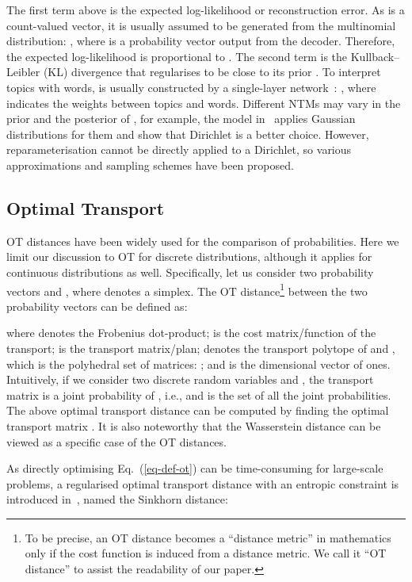 \documentclass{article}
\begin{document}
The first term above is the expected log-likelihood or reconstruction error. As  is a count-valued vector, it is usually assumed to be generated from the multinomial distribution: , where  is a probability vector output from the decoder. Therefore, the expected log-likelihood is proportional to . The second term is the Kullback–Leibler (KL) divergence that regularises  to be close to its prior . To interpret topics with words,  is usually constructed by a single-layer network~\citep{srivastava2017autoencoding}: , where  indicates the weights between topics and words.
Different NTMs may vary in the prior and the posterior of , for example, the model in~\citet{miao2017discovering} applies Gaussian distributions for them and \citet{srivastava2017autoencoding,burkhardt2019decoupling} show that Dirichlet is a better choice. However, reparameterisation cannot be directly applied to a Dirichlet, so various approximations and sampling schemes have been proposed.

\subsection{Optimal Transport}
OT distances have been widely used for the comparison of probabilities. Here we limit our discussion to OT for discrete distributions, although it applies for continuous distributions as well.
Specifically, let us consider two probability vectors  and , where  denotes a  simplex.
The OT distance\footnote{To be precise, an OT distance becomes a ``distance metric'' in mathematics only if the cost function  is induced from a distance metric. We call it ``OT distance'' to assist the readability of our paper.} between the two probability vectors can be defined as:
\vspace{0.01cm}

where  denotes the Frobenius dot-product;
 is the cost matrix/function of the transport;
 is the transport matrix/plan;
 denotes the transport polytope of  and , which is the polyhedral set of  matrices:
;
and  is the  dimensional vector of ones.
Intuitively, if we consider two discrete random variables  and , the transport matrix  is a joint probability of , i.e.,  and  is the set of all the joint probabilities. The above optimal transport distance can be computed by finding the optimal transport matrix .
It is also noteworthy that the Wasserstein distance can be viewed as a specific case of the OT distances.

As directly optimising Eq.~(\ref{eq-def-ot}) can be time-consuming for large-scale problems, a regularised optimal transport distance with an entropic constraint is introduced in~\cite{cuturi2013sinkhorn}, named the Sinkhorn distance:
\end{document}
